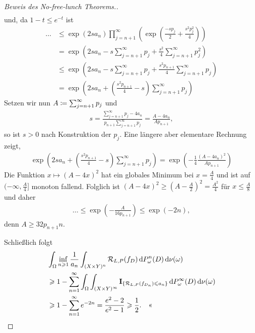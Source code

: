\begin{proof}[Beweis des No-free-lunch Theorems.]
\begin{align*}
\end{align*}
und, da $1-t \le e^{-t}$ ist
\begin{align*}
\ldots &\le
\exp(2sa_n)\prod_{j=n+1}^\infty
\left(\exp\left(\frac{-sp_j}{2} + \frac{s^2p_j^2}{4}\right)\right)\\
&=
\exp\left(2sa_n-s\sum_{j=n+1}^\infty p_j +
\frac{s^2}{4}\sum_{j=n+1}^\infty p_j^2\right)\\
&\le
\exp\left(2sa_n-s\sum_{j=n+1}^\infty p_j +
\frac{s^2p_{n+1}}{4}\sum_{j=n+1}^\infty p_j\right)\\
&=\exp\left(2sa_n+\left(\frac{s^2p_{n+1}}{4}-s\right)\sum_{j=n+1}^\infty p_j\right)
\end{align*}
Setzen wir nun $A\coloneq\sum_{j=n+1}^\infty p_j$ und
\begin{align*}
s = \frac{\sum_{j=n+1}^\infty p_j - 4a_n}{p_{n+1}\sum_{j=n+1}^\infty p_j} =
\frac{A-4a_n}{Ap_{n+1}},
\end{align*}
so ist $s>0$ nach Konstruktion der $p_j$. Eine längere aber elementare Rechnung
zeigt,
\begin{align*}
\exp\left(2sa_n+\left(\frac{s^2p_{n+1}}{4}-s\right)\sum_{j=n+1}^\infty p_j\right)
=
\exp\left(-\frac{1}{4}\frac{(A-4a_n)^2}{Ap_{n+1}}\right)
\end{align*}
Die Funktion $x\mapsto (A-4x)^2$ hat ein globales Minimum bei $x=\frac{A}{4}$
und ist auf $(-\infty, \frac{A}{4}]$ monoton fallend. Folglich ist
$(A-4x)^2\ge \left(A-\frac{A}{2}\right)^2 = \frac{A^2}{4}$ für 
$x\le\frac{A}{8}$ und daher
\begin{align*}
\ldots \le
\exp\left(-\frac{A}{16 p_{n+1}}\right) \le \exp(-2n),
\end{align*}
denn $A\ge 32 p_{n+1} n$.

Schließlich folgt
\begin{align*}
&\int_\Omega \inf_{n\geqslant 1} \frac{1}{a_n}\int_{(X\times Y)^n}
\mathcal{R}_{L,P}(f_D)\,\mathrm{d} P_\omega^n(D)\,\mathrm{d} \nu(\omega)\\
&\geqslant 1- \sum_{n=1}^\infty \int_\Omega \int_{(X\times Y)^\infty}
\mathbf{I}_{\left\{ \mathcal{R}_{L,P}(f_{D_n}) \leqslant a_n \right\}}\,\mathrm{d} P_\omega^\infty(D) \,\mathrm{d} \nu(\omega)\\
&\geqslant 1-\sum_{n=1}^\infty e^{-2n} = \frac{e^2-2}{e^2-1}\geqslant \frac{1}{2}.\quad\text{<<}
\end{align*}
\end{proof}

